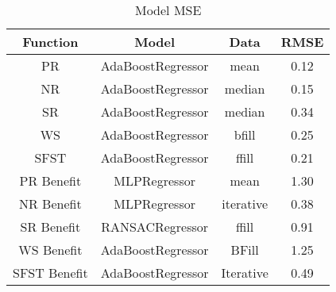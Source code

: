 \begin{table}
\centering
\begin{tabular}{|c|c|c|c|}
\hline
\textbf{Function} & \textbf{Model} & \textbf{Data} & \textbf{RMSE} \\
\hline
PR    & AdaBoostRegressor & mean & 0.12 \\
\hline
NR    & AdaBoostRegressor  & median & 0.15 \\
\hline
SR    & AdaBoostRegressor & median & 0.34 \\
\hline
WS    & AdaBoostRegressor & bfill & 0.25\\
\hline
SFST  & AdaBoostRegressor & ffill & 0.21 \\
\hline
PR Benefit & MLPRegressor &  mean & 1.30 \\
\hline
NR Benefit  & MLPRegressor & iterative & 0.38 \\
\hline
SR Benefit &  RANSACRegressor &  ffill & 0.91 \\
\hline
WS Benefit & AdaBoostRegressor & BFill & 1.25 \\
\hline
SFST Benefit & AdaBoostRegressor & Iterative & 0.49 \\
\hline
\end{tabular}
\caption{Model MSE}
\label{tab:model_reg_all_best}
\end{table}